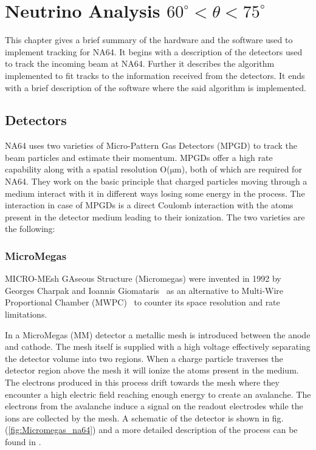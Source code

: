 
\chapter{Neutrino Analysis $60^\circ < \theta < 75^\circ$}
\label{sec:tracking}
This chapter gives a brief summary of the hardware and the software used to implement tracking for NA64. It begins with a description of the detectors used to track the incoming beam at NA64. Further it describes the algorithm implemented to fit tracks to the information received from the detectors. It ends with a brief description of the software where the said algorithm is implemented.

\section{Detectors}
NA64 uses two varieties of Micro-Pattern Gas Detectors (MPGD) to track the beam particles and estimate their momentum. MPGDs offer a high rate capability along with a spatial resolution O($\mathrm{\mu m}$), both of which are required for NA64. They work on the basic principle that charged particles moving through a medium interact with it in different ways losing some energy in the process. The interaction in case of MPGDs is a direct Coulomb interaction with the atoms present in the detector medium leading to their ionization. The two varieties are the following:
\subsection{MicroMegas}
\label{sec:MM}
MICRO-MEsh GAseous Structure (Micromegas) were invented in 1992 by Georges Charpak and Ioannis Giomataris~\cite{CHARPAK200226} as an alternative to Multi-Wire Proportional Chamber (MWPC)~\cite{Sauli:1977mt} to counter its space resolution and rate limitations.

In a MicroMegas (MM) detector a metallic mesh is introduced between the anode and cathode. The mesh itself is supplied with a high voltage effectively separating the detector volume into two regions. When a charge particle traverses the detector region above the mesh it will ionize the atoms present in the medium. The electrons produced in this process drift towards the mesh where they encounter a high electric field reaching enough energy to create an avalanche. The electrons from the avalanche induce a signal on the readout electrodes while the ions are collected by the mesh. A schematic of the detector is shown in fig.(\ref{fig:Micromegas_na64}) and a more detailed description of the process can be found in \cite{CHARPAK200226}.

